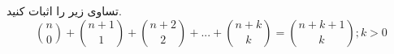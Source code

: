 \p
تساوی زیر را اثبات کنید. 
$${n \choose 0} + {{n+1} \choose 1} + {{n+2} \choose 2} + ... + {{n+k} \choose k} = {{n+k+1} \choose k} ; k > 0$$